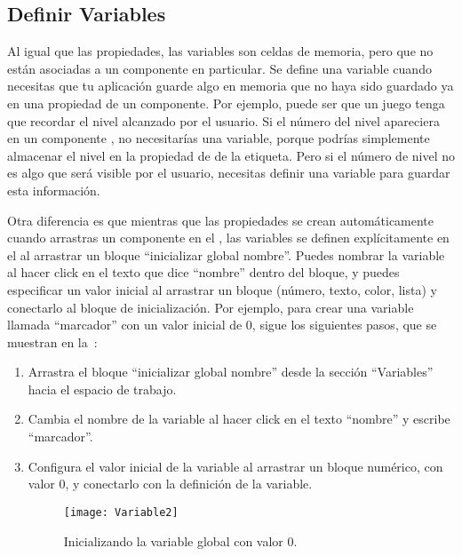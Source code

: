 \subsection*{Definir Variables}

Al igual que las propiedades, las variables son celdas de memoria,
pero que no están asociadas a un componente en particular. Se define
una variable cuando necesitas que tu aplicación guarde algo en memoria
que no haya sido guardado ya en una propiedad de un componente. Por
ejemplo, puede ser que un juego tenga que recordar el nivel alcanzado
por el usuario. Si el número del nivel apareciera en un componente
, no necesitarías una variable, porque podrías
simplemente almacenar el nivel en la propiedad de  de
la etiqueta. Pero si el número de nivel no es algo que será visible
por el usuario, necesitas definir una variable para guardar esta
información.

Otra diferencia es que mientras que las propiedades se crean automáticamente cuando arrastras un
componente en el \designer, las variables se definen explícitamente en el
\blockEditor al arrastrar un bloque ``inicializar global nombre''. Puedes nombrar la variable al hacer click en el texto que
dice ``nombre'' dentro del bloque, y puedes especificar un valor inicial
al arrastrar un bloque (número, texto, color, lista) y conectarlo al
bloque de inicialización. Por ejemplo, para crear una variable llamada ``marcador'' con un valor inicial de
0, sigue los siguientes pasos, que se muestran en la~:

\begin{enumerate}

\item Arrastra el bloque  ``inicializar global nombre'' desde la sección
  ``Variables'' hacia el espacio de trabajo.

\item Cambia el nombre de la variable al hacer click en el texto
  ``nombre'' y escribe ``marcador''.

\item Configura el valor inicial de la variable al arrastrar un bloque
  numérico, con valor 0, y conectarlo con la definición de la
  variable.

\begin{figure}[H]
\centering
\texttt{[image: Variable2]}
\caption{Inicializando la variable global  con
  valor 0.}
\label{fig:Variable2}
\end{figure}

\end{enumerate}

